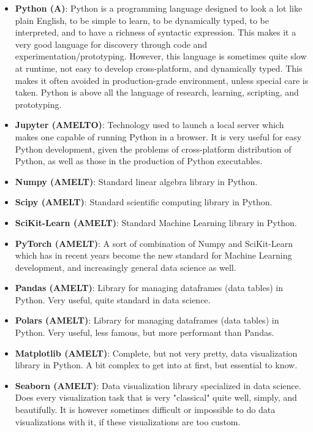 \documentclass{article}
\begin{document}
\begin{itemize}

	\item \textbf{Python (A)}: Python is a programming language designed to look a lot like plain English, to be simple to learn, to be dynamically typed, to be interpreted, and to have a richness of syntactic expression. This makes it a very good language for discovery through code and experimentation/prototyping. However, this language is sometimes quite slow at runtime, not easy to develop cross-platform, and dynamically typed. This makes it often avoided in production-grade environment, unless special care is taken. Python is above all the language of research, learning, scripting, and prototyping.

	\item \textbf{Jupyter (AMELTO)}: Technology used to launch a local server which makes one capable of running Python in a browser. It is very useful for easy Python development, given the problems of cross-platform distribution of Python, as well as those in the production of Python executables.

	\item \textbf{Numpy (AMELT)}: Standard linear algebra library in Python.

	\item \textbf{Scipy (AMELT)}: Standard scientific computing library in Python.

	\item \textbf{SciKit-Learn (AMELT)}: Standard Machine Learning library in Python.

	\item \textbf{PyTorch (AMELT)}: A sort of combination of Numpy and SciKit-Learn which has in recent years become the new standard for Machine Learning development, and increasingly general data science as well.

	\item \textbf{Pandas (AMELT)}: Library for managing dataframes (data tables) in Python. Very useful, quite standard in data science.

	\item \textbf{Polars (AMELT)}: Library for managing dataframes (data tables) in Python. Very useful, less famous, but more performant than Pandas.

	\item \textbf{Matplotlib (AMELT)}: Complete, but not very pretty, data visualization library in Python. A bit complex to get into at first, but essential to know.

	\item \textbf{Seaborn (AMELT)}: Data visualization library specialized in data science. Does every visualization task that is very "classical" quite well, simply, and beautifully. It is however sometimes difficult or impossible to do data visualizations with it, if these visualizations are too custom.

\end{itemize}
\end{document}
